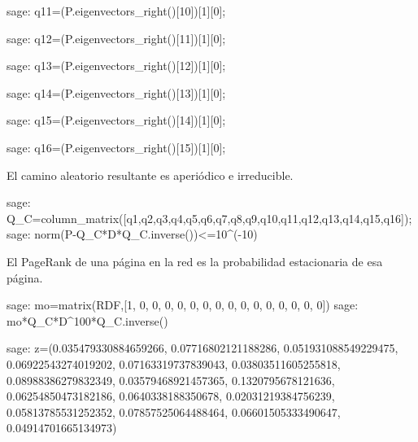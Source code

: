 \begin{sagecommandline}
    sage: q11=(P.eigenvectors_right()[10])[1][0];
\end{sagecommandline}

\begin{sagecommandline}
    sage: q12=(P.eigenvectors_right()[11])[1][0];
\end{sagecommandline}

\begin{sagecommandline}
    sage: q13=(P.eigenvectors_right()[12])[1][0];
\end{sagecommandline}

\begin{sagecommandline}
    sage: q14=(P.eigenvectors_right()[13])[1][0];
\end{sagecommandline}

\begin{sagecommandline}
    sage: q15=(P.eigenvectors_right()[14])[1][0];
\end{sagecommandline}

\begin{sagecommandline}
    sage: q16=(P.eigenvectors_right()[15])[1][0];
\end{sagecommandline}

\par El camino aleatorio resultante es aperiódico e irreducible.

\begin{sagecommandline}
    sage: Q_C=column_matrix([q1,q2,q3,q4,q5,q6,q7,q8,q9,q10,q11,q12,q13,q14,q15,q16]);
    sage: norm(P-Q_C*D*Q_C.inverse())<=10^(-10)
\end{sagecommandline}

\par El PageRank de una página en la red es la probabilidad estacionaria de esa página.
    
\begin{sagecommandline}
    sage: mo=matrix(RDF,[1, 0, 0, 0, 0, 0, 0, 0, 0, 0, 0, 0, 0, 0, 0, 0])
    sage: mo*Q_C*D^100*Q_C.inverse()
\end{sagecommandline}

\begin{sagecommandline}
    sage: z=(0.035479330884659266, 0.07716802121188286, 0.051931088549229475, 0.06922543274019202, 0.07163319737839043, 0.03803511605255818, 0.08988386279832349, 0.03579468921457365, 0.1320795678121636, 0.06254850473182186, 0.0640338188350678, 0.02031219384756239, 0.05813785531252352, 0.07857525064488464, 0.06601505333490647, 0.04914701665134973)
\end{sagecommandline}

